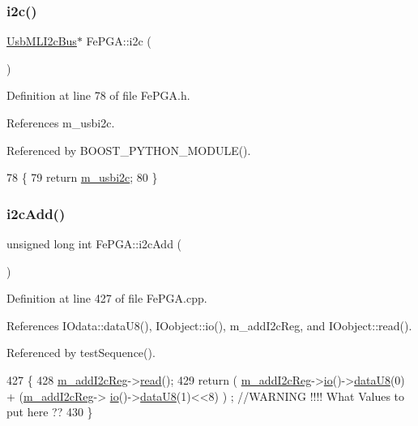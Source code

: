 \subsubsection{\texorpdfstring{i2c()}{i2c()}}
{\footnotesize\ttfamily \hyperlink{classUsbMLI2cBus}{Usb\+M\+L\+I2c\+Bus}$\ast$ Fe\+P\+G\+A\+::i2c (\begin{DoxyParamCaption}{ }\end{DoxyParamCaption})\hspace{0.3cm}{\ttfamily [inline]}}



Definition at line 78 of file Fe\+P\+G\+A.\+h.



References m\+\_\+usbi2c.



Referenced by B\+O\+O\+S\+T\+\_\+\+P\+Y\+T\+H\+O\+N\+\_\+\+M\+O\+D\+U\+L\+E().


\begin{DoxyCode}
78                     \{
79     \textcolor{keywordflow}{return} \hyperlink{classFePGA_a09fdde4002008daa0d15672772dd4483}{m\_usbi2c};
80   \}
\end{DoxyCode}
\mbox{\label{classFePGA_a26b690b730b5f668ab28fb8deab8326b}} 
\subsubsection{\texorpdfstring{i2c\+Add()}{i2cAdd()}}
{\footnotesize\ttfamily unsigned long int Fe\+P\+G\+A\+::i2c\+Add (\begin{DoxyParamCaption}{ }\end{DoxyParamCaption})}



Definition at line 427 of file Fe\+P\+G\+A.\+cpp.



References I\+Odata\+::data\+U8(), I\+Oobject\+::io(), m\+\_\+add\+I2c\+Reg, and I\+Oobject\+::read().



Referenced by test\+Sequence().


\begin{DoxyCode}
427                                \{
428   \hyperlink{classFePGA_af3ef3467ba803e6d3b970ea8982d6246}{m\_addI2cReg}->\hyperlink{classIOobject_aa07610c11963b1db6710e3c76ceea456}{read}();
429   \textcolor{keywordflow}{return} ( \hyperlink{classFePGA_af3ef3467ba803e6d3b970ea8982d6246}{m\_addI2cReg}->\hyperlink{classIOobject_af04fb94137c3d86849f478ac5afab5d1}{io}()->\hyperlink{classIOdata_a75e9c318dbac3a39402179070943d4bc}{dataU8}(0) + (\hyperlink{classFePGA_af3ef3467ba803e6d3b970ea8982d6246}{m\_addI2cReg}->
      \hyperlink{classIOobject_af04fb94137c3d86849f478ac5afab5d1}{io}()->\hyperlink{classIOdata_a75e9c318dbac3a39402179070943d4bc}{dataU8}(1)<<8) ) ; \textcolor{comment}{//WARNING !!!! What Values to put here ??}
430 \}
\end{DoxyCode}
\mbox{\label{classFePGA_a5577463c8478cb6d54fc3c75b26cd819}} 

